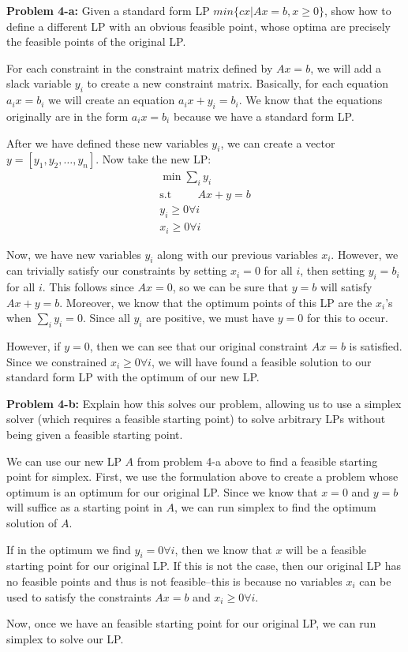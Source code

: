 \documentclass[psamsfonts]{amsart}
\newenvironment{sol}{\vspace{0.25cm}{\large \bfseries Solution:}}{\qedsymbol}
\newenvironment{prob}[1]{\begin{framed}{\large \bfseries Problem #1:}}{\end{framed}}
\begin{document}
\begin{prob}{4-a}
Given a standard form LP $min\{cx | Ax = b, x \geq 0 \}$, show how to define a different LP with an obvious feasible point, whose optima are precisely the feasible points of the original LP. 
\end{prob}
\begin{sol}
For each constraint in the constraint matrix defined by $Ax = b$, we will add a slack variable $y_i$ to create a new constraint matrix. Basically, for each equation $a_i x = b_i$ we will create an equation $a_i x + y_i = b_i$. We know that the equations originally are in the form $a_i x = b_i$ because we have a standard form LP. 

After we have defined these new variables $y_i$, we can create a vector $y = [y_1, y_2, \ldots, y_n]$. Now take the new LP:
\begin{eqnarray}
\min \sum_{i} y_i \\ 
\text{s.t} \hspace{1cm} Ax + y = b \\
y_i \geq 0 \forall i \\
x_i \geq 0 \forall i 
\end{eqnarray}

Now, we have new variables $y_i$ along with our previous variables $x_i$. However, we can trivially satisfy our constraints by setting $x_i = 0$ for all $i$, then setting $y_i = b_i$ for all $i$. This follows since $Ax = 0$, so we can be sure that $y=b$ will satisfy $Ax + y = b$. Moreover, we know that the optimum points of this LP are the $x_i$'s when $\sum_{i} y_i = 0$. Since all $y_i$ are positive, we must have $y = 0$ for this to occur.

However, if $y=0$, then we can see that our original constraint $Ax = b$ is satisfied. Since we constrained $x_i \geq 0 \forall i$, we will have found a feasible solution to our standard form LP with the optimum of our new LP.
\end{sol}

\begin{prob}{4-b}
Explain how this solves our problem, allowing us to use a simplex solver (which requires a feasible starting point) to solve arbitrary LPs without being given a feasible starting point.
\end{prob}
\begin{sol}
We can use our new LP $A$ from problem 4-a above to find a feasible starting point for simplex. First, we use the formulation above to create a problem whose optimum is an optimum for our original LP. Since we know that $x = 0$ and $y=b$ will suffice as a starting point in $A$, we can run simplex to find the optimum solution of $A$. 

If in the optimum we find $y_i = 0 \forall i$, then we know that $x$ will be a feasible starting point for our original LP. If this is not the case, then our original LP has no feasible points and thus is not feasible--this is because no variables $x_i$ can be used to satisfy the constraints $Ax = b$ and $x_i \geq 0 \forall i$. 

Now, once we have an feasible starting point for our original LP, we can run simplex to solve our LP.  
\end{sol}
\end{document}
